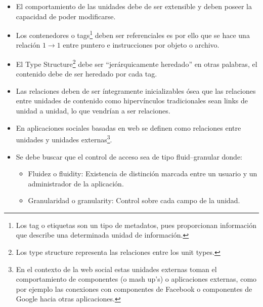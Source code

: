 \documentclass[oneside,12pt,a4paper]{memoir}%
\begin{document}
\begin{itemize}
		\begin{itemize}
		  \item El comportamiento de las unidades debe de ser extensible y deben
		  poseer la capacidad de  poder modificarse.
		  \item Los contenedores o tags\footnote{Los tag o etiquetas son un tipo de
		  metadatos, pues proporcionan informaci\'on que describe una determinada
		  unidad de informaci\'on.} deben ser referenciales es por ello que se
		  hace una relaci\'on $1 \to 1$ entre puntero e instrucciones por objeto o archivo.
		  \item El Type Structure\footnote{Los type structure representa las
		  relaciones entre los unit types.} debe ser ``jer\'arquicamente heredado'' en
		  otras palabras, el contenido debe de ser heredado por cada tag.
		  \item Las relaciones deben de ser \'integramente inicializables \'osea que las
		  relaciones entre unidades de contenido como hiperv\'inculos tradicionales
		  sean links de unidad a unidad, lo que vendr\'ian a ser relaciones.
		  \item En aplicaciones sociales basadas en web se definen como relaciones
		  entre unidades y unidades externas\footnote{En el contexto de la web social
		  estas unidades externas toman el comportamiento de componentes (o mash up's)
		  o aplicaciones externas, como por ejemplo las conexiones con
		  componentes de Facebook o componentes de Google hacia otras aplicaciones.}.
		  \item Se debe buscar que el control de acceso sea de tipo fluid--granular
		  donde:
		  
		  	\begin{itemize}
		  	  \item Fluidez o fluidity: Existencia de distinci\'on marcada entre un
		  	  usuario y un administrador de la aplicaci\'on.
		  	  \item Granularidad o granularity: Control sobre cada campo de la unidad.
		  	\end{itemize}
		  	

\end{itemize}
\end{itemize}
\end{document}
